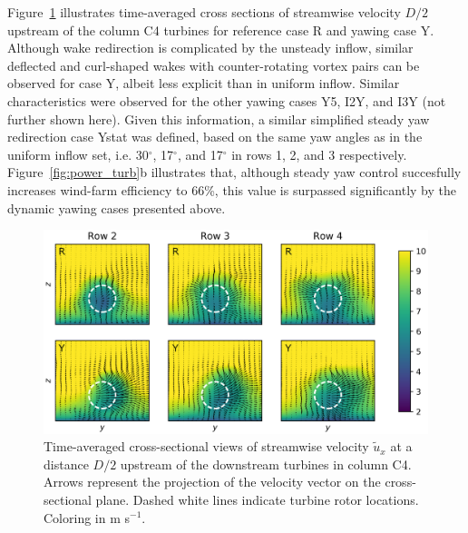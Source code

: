 \documentclass[energies,article,submit,moreauthors,latex,10pt,a4paper]{mdpi}
\begin{document}
Figure~\ref{fig:cross_section_turb} illustrates time-averaged cross sections of streamwise velocity $D/2$ upstream of the column C4 turbines for reference case R and yawing case Y. Although wake redirection is complicated by the unsteady inflow, similar deflected and curl-shaped wakes with counter-rotating vortex pairs can be observed for case Y, albeit less explicit than in uniform inflow. Similar characteristics were observed for the other yawing cases Y5, I2Y, and I3Y (not further shown here). Given this information, a similar simplified steady yaw redirection case Ystat was defined, based on the same yaw angles as in the uniform inflow set, i.e. 30$^\circ$, 17$^\circ$, and 17$^\circ$ in rows 1, 2, and 3 respectively. Figure~\ref{fig:power_turb}b illustrates that, although steady yaw control succesfully increases wind-farm efficiency to 66\%, this value is surpassed significantly by the dynamic yawing cases presented above.
\begin{figure}
	\includegraphics[width=\textwidth]{figure14}
	\caption{Time-averaged cross-sectional views of streamwise velocity $\widetilde{u}_x$ at a distance $D/2$ upstream of the downstream turbines in column C4. Arrows represent the projection of the velocity vector on the cross-sectional plane. Dashed white lines indicate turbine rotor locations. Coloring in m s$^{-1}$. \label{fig:cross_section_turb}}
\end{figure}
\end{document}
